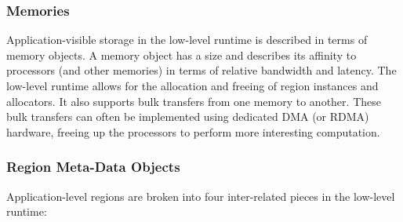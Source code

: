 \subsubsection{Memories}
\label{subsec:memories}
Application-visible storage in the low-level runtime is described in terms of
memory objects.  A memory object has a size and describes its affinity to 
processors (and other memories) in terms of relative bandwidth and latency.
The low-level runtime allows for the allocation and freeing of region instances
and allocators.  It also supports bulk transfers from one memory to another.
These bulk transfers can often be implemented using dedicated DMA (or RDMA)
hardware, freeing up the processors to perform more interesting
computation. 

\subsubsection{Region Meta-Data Objects}
\label{subsec:regionmeta}
Application-level regions are broken into four inter-related pieces in the
low-level runtime:
